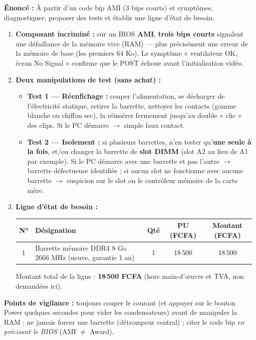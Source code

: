 \documentclass[11pt]{article}
\newcommand{\cle}[1]{{\popxbold\color{popdark}#1}}
\begin{document}
\begin{corrige}
\textbf{Énoncé :} À partir d'un code bip AMI (3 bips courts) et symptômes, diagnostiquer, proposer des tests et établir une ligne d'état de besoin.
\tcblower
\begin{enumerate}
    \item \textbf{Composant incriminé :} sur un BIOS \textbf{AMI}, \textbf{trois bips courts} signalent une défaillance de la \cle{mémoire vive} (RAM) — plus précisément une erreur de la mémoire de base (les premiers 64 Ko). Le symptôme « ventilateur OK, écran No Signal » confirme que le POST échoue avant l'initialisation vidéo.
    \item \textbf{Deux manipulations de test (sans achat) :}
    \begin{itemize}
        \item \textbf{Test 1 — Réenfichage :} couper l'alimentation, se décharger de l'électricité statique, retirer la barrette, nettoyer les contacts (gomme blanche ou chiffon sec), la réinsérer fermement jusqu'au double « clic » des clips. Si le PC démarre $\rightarrow$ simple faux contact.
        \item \textbf{Test 2 — Isolement :} si plusieurs barrettes, n'en tester qu'\textbf{une seule à la fois}, et/ou changer la barrette de \textbf{slot DIMM} (slot A2 au lieu de A1 par exemple). Si le PC démarre avec une barrette et pas l'autre $\rightarrow$ barrette défectueuse identifiée ; si aucun slot ne fonctionne avec aucune barrette $\rightarrow$ suspicion sur le slot ou le contrôleur mémoire de la carte mère.
    \end{itemize}
    \item \textbf{Ligne d'état de besoin :}
    \begin{center}
    \begin{tabularx}{\linewidth}{|c|X|c|c|c|}\hline
    \rowcolor{popblueL}
    \textbf{N°} & \textbf{Désignation} & \textbf{Qté} & \textbf{PU (FCFA)} & \textbf{Montant (FCFA)} \\\hline
    1 & Barrette mémoire DDR4 8 Go 2666 MHz (neuve, garantie 1 an) & 1 & 18\,500 & 18\,500 \\\hline
    \end{tabularx}
    \end{center}
    Montant total de la ligne : \textbf{18\,500 FCFA} (hors main-d'œuvre et TVA, non demandées ici).
\end{enumerate}

\textbf{Points de vigilance :} toujours couper le courant (et appuyer sur le bouton Power quelques secondes pour vider les condensateurs) avant de manipuler la RAM ; ne jamais forcer une barrette (détrompeur central) ; citer le code bip \emph{en précisant le BIOS} (AMI $\neq$ Award).
\end{corrige}
\end{document}
